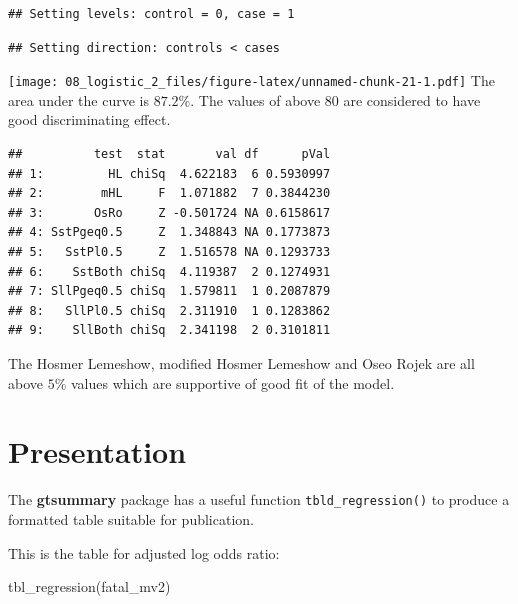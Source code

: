 \documentclass[
  10pt,
]{krantz}
\newenvironment{Shaded}{\begin{snugshade}}{\end{snugshade}}
\newcommand{\FunctionTok}[1]{\textcolor[rgb]{0.00,0.00,0.00}{#1}}
\newcommand{\NormalTok}[1]{#1}
\newcommand{\SpecialCharTok}[1]{\textcolor[rgb]{0.00,0.00,0.00}{#1}}
\begin{document}
\begin{verbatim}
## Setting levels: control = 0, case = 1
\end{verbatim}

\begin{verbatim}
## Setting direction: controls < cases
\end{verbatim}

\texttt{[image: 08\_logistic\_2\_files/figure-latex/unnamed-chunk-21-1.pdf]}
The area under the curve is \(87.2\%\). The values of above 80 are considered to have good discriminating effect.

\begin{Shaded}
\end{Shaded}

\begin{verbatim}
##          test  stat       val df      pVal
## 1:         HL chiSq  4.622183  6 0.5930997
## 2:        mHL     F  1.071882  7 0.3844230
## 3:       OsRo     Z -0.501724 NA 0.6158617
## 4: SstPgeq0.5     Z  1.348843 NA 0.1773873
## 5:   SstPl0.5     Z  1.516578 NA 0.1293733
## 6:    SstBoth chiSq  4.119387  2 0.1274931
## 7: SllPgeq0.5 chiSq  1.579811  1 0.2087879
## 8:   SllPl0.5 chiSq  2.311910  1 0.1283862
## 9:    SllBoth chiSq  2.341198  2 0.3101811
\end{verbatim}

The Hosmer Lemeshow, modified Hosmer Lemeshow and Oseo Rojek are all above \(5\%\) values which are supportive of good fit of the model.

\hypertarget{presentation}{%
\section{Presentation}\label{presentation}}

The \textbf{gtsummary} package has a useful function \texttt{tbld\_regression()} to produce a formatted table suitable for publication.

This is the table for adjusted log odds ratio:

\begin{Shaded}
\begin{Highlighting}[]
\FunctionTok{tbl\_regression}\NormalTok{(fatal\_mv2)}
\end{Highlighting}
\end{Shaded}
\end{document}
